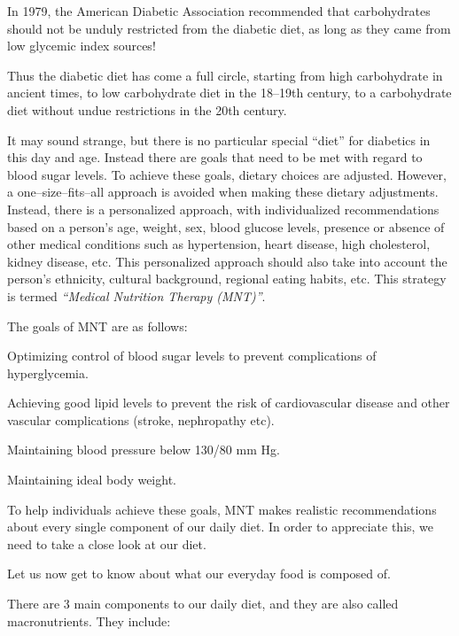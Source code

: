In 1979, the American Diabetic Association recommended that carbohydrates should not be unduly restricted from the diabetic diet, as long as they came from low glycemic index sources!

Thus the diabetic diet has come a full circle, starting from high carbohydrate in ancient times, to low carbohydrate diet in the 18–19th century, to a carbohydrate diet without undue restrictions in the 20th century.


It may sound strange, but there is no particular special “diet” for diabetics in this day and age. Instead there are goals that need to be met with regard to blood sugar levels. To achieve these goals, dietary choices are adjusted. However, a one–size–fits–all approach is avoided when making these dietary adjustments. Instead, there is a personalized approach, with individualized recommendations based on a person’s age, weight, sex, blood glucose levels, presence or absence of other medical conditions such as hypertension, heart disease, high cholesterol, kidney disease, etc. This personalized approach should also take into account the person’s ethnicity, cultural background, regional eating habits, etc. This strategy is termed \textit{“Medical Nutrition Therapy (MNT)”}.

The goals of MNT are as follows:

\item Optimizing control of blood sugar levels to prevent complications of hyperglycemia.

 \item Achieving good lipid levels to prevent the risk of cardiovascular disease and other vascular complications (stroke, nephropathy etc).

 \item Maintaining blood pressure below 130/80 mm Hg.

 \item Maintaining ideal body weight.

To help individuals achieve these goals, MNT makes realistic recommendations about every single component of our daily diet. In order to appreciate this, we need to take a close look at our diet.

Let us now get to know about what our everyday food is composed of.

There are 3 main components to our daily diet, and they are also called macronutrients. They include:

